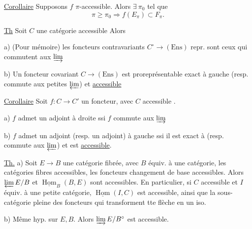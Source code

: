 \uline{Corollaire} Supposons $f$ $\pi$-accessible. Alors  $\exists\ \pi_0$ tel que
\[
 \pi\geq\pi_0\Longrightarrow f(E_\pi)\subset F_\pi .
\]

\uline{Th} Soit $C$ une catégorie accessible   Alors

a) (Pour mémoire) les foncteurs contravariants $C^\circ\to(\mathrm{Ens})$ repr. sont ceux qui commutent aux  $\varinjlim$\deleted{\unsure{---}}


b) Un foncteur covariant  $C\to(\mathrm{Ens})$ est proreprésentable    exact à gauche (resp. commute aux petites $\varprojlim$) et \uline{accessible}

\uline{Corollaire} Soit $f:C\to C'$ un foncteur, avec $C$ accessible .

a) $f$ admet un adjoint à droite ssi $f$ commute aux  $\varinjlim$

b) $f$ admet un adjoint  (resp. un adjoint) à gauche ssi il est exact à  (resp. commute aux  $\varprojlim$)  et est \uline{accessible}.

\uline{Th.} a) Soit $E\to B$ une catégorie fibrée, avec $B$ équiv. à une   catégorie, les catégories fibres accessibles, les foncteurs changement de base accessibles. Alors $\varprojlim E/B$ et $\underline{\operatorname{Hom}}_B(B,E)$ sont accessibles. En particulier, si $C$ accessible et $I$ équiv. à une petite catégorie, $\underline{\operatorname{Hom}}(I,C)$ est accessible, ainsi que la sous-catégorie pleine des foncteurs qui transforment tte flèche en un iso.


b) Même hyp. sur $E,B$. Alors $\varinjlim E/B^\circ$ est accessible.


